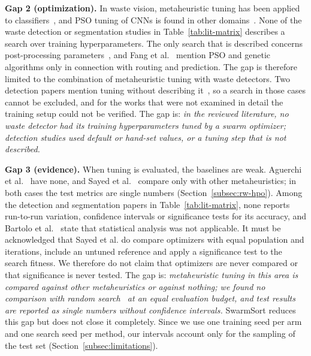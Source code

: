 \textbf{Gap 2 (optimization).} In waste vision, metaheuristic tuning has been applied to classifiers~\cite{sayed2024intelligent,mao2021recycling}, and PSO tuning of CNNs is found in other domains~\cite{aguerchi2024cnn}. None of the waste detection or segmentation studies in Table~\ref{tab:lit-matrix} describes a search over training hyperparameters. The only search that is described concerns post-processing parameters~\cite{wang2020multilevel}, and Fang et al.~\cite{fang2023artificial} mention PSO and genetic algorithms only in connection with routing and prediction. The gap is therefore limited to the combination of metaheuristic tuning with waste detectors. Two detection papers mention tuning without describing it~\cite{liao2022realtime,bartolo2025learning}, so a search in those cases cannot be excluded, and for the works that were not examined in detail the training setup could not be verified. The gap is: \emph{in the reviewed literature, no waste detector had its training hyperparameters tuned by a swarm optimizer; detection studies used default or hand-set values, or a tuning step that is not described.}

\textbf{Gap 3 (evidence).} When tuning is evaluated, the baselines are weak. Aguerchi et al.~\cite{aguerchi2024cnn} have none, and Sayed et al.~\cite{sayed2024intelligent} compare only with other metaheuristics; in both cases the test metrics are single numbers (Section~\ref{subsec:rw-hpo}). Among the detection and segmentation papers in Table~\ref{tab:lit-matrix}, none reports run-to-run variation, confidence intervals or significance tests for its accuracy, and Bartolo et al.~\cite{bartolo2025learning} state that statistical analysis was not applicable. It must be acknowledged that Sayed et al. do compare optimizers with equal population and iterations, include an untuned reference and apply a significance test to the search fitness. We therefore do not claim that optimizers are never compared or that significance is never tested. The gap is: \emph{metaheuristic tuning in this area is compared against other metaheuristics or against nothing; we found no comparison with random search~\cite{bergstra2012random} at an equal evaluation budget, and test results are reported as single numbers without confidence intervals.} SwarmSort reduces this gap but does not close it completely. Since we use one training seed per arm and one search seed per method, our intervals account only for the sampling of the test set (Section~\ref{subsec:limitations}).

